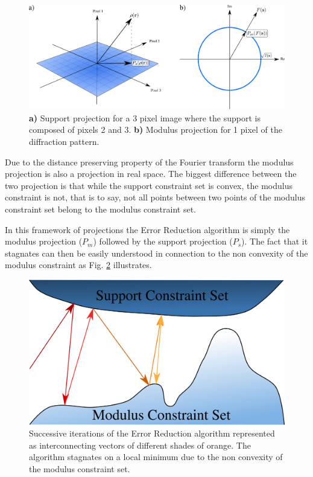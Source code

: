 \begin{figure}[h]
  \centering
  \includegraphics[width=1 \columnwidth]{Image_Reconstruction/projections.png}
  \caption{{\bf a)} Support projection for a 3 pixel image where the support is
    composed of pixels 2 and 3. {\bf b)} Modulus projection for 1 pixel of the
    diffraction pattern.}
  \label{Fig:Projections}
\end{figure}

Due to the distance preserving property of the Fourier transform the modulus
projection is also a projection in real space. The biggest difference between
the two projection is that while the support constraint set is convex, the
modulus constraint is not, that is to say, not all points between two points of the modulus
constraint set belong to the modulus constraint set.

In this framework of projections the Error Reduction algorithm is simply the
modulus projection ($P_m$) followed by the support projection ($P_s$). The fact that it stagnates can then be easily understood in
connection to the non convexity of the modulus constraint as
Fig. \ref{Fig:Stagnation} illustrates.

\begin{figure}[h]
\centering
  \includegraphics[width=0.8 \columnwidth]{Image_Reconstruction/Stagnation.png}
  \caption{Successive iterations of the Error Reduction algorithm represented as interconnecting
    vectors of different shades of orange. The algorithm stagnates on a local minimum due
    to the non convexity of the modulus constraint set.}
  \label{Fig:Stagnation}
\end{figure}

